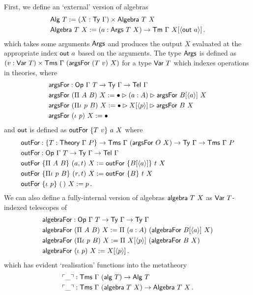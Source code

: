 First, we define an `external' version of algebras
\begin{align*}
    &\mta{Alg}\ T := (X : \Ty\ \Gamma) \times \mta{Algebra}\ T\ X \\
    &\mta{Algebra}\ T\ X := (a : \mta{Args}\ T\ X) \to \Tm\ \Gamma\ X[\Msub{\mta{out}\ a}] \,.
\end{align*}
which takes some arguments $\textsf{Args}$ and produces the output $X$
evaluated at the appropriate index $\mta{out}\ a$ based on the arguments. The
type $\textsf{Args}$ is defined as $(v : \textsf{Var}\ T) \times \textsf{Tms}\ \Gamma\
(\textsf{argsFor}\ (T\ v)\ X)$ for a type $\textsf{Var}\ T$ which indexes operations
in theories, where
\begin{align*}
    &\mta{argsFor} : \mta{Op}\ \Gamma\ T \to \Ty\ \Gamma \to \Tel\ \Gamma \\
    &\mta{argsFor}\ (\Pi\ A\ B)\ X := \bullet \rhd (a : A) \rhd \mta{argsFor}\ B[\Msub a]\ X \\
    &\mta{argsFor}\ (\Pi\iota\ p\ B)\ X := \bullet \rhd X[\Msub p] \rhd \mta{argsFor}\ B\ X \\
    &\mta{argsFor}\ (\iota\ p)\ X := \bullet
\end{align*}
and $\textsf{out}$ is defined as $\mta{outFor}\ \{T\ v\}\ a\ X$ where
\begin{align*}
    &\mta{outFor} : \{T : \Theory\ \Gamma\ P\} \to \Tms\ \Gamma\ (\mta{argsFor}\ O\ X) \to \Ty\ \Gamma \to \Tms\ \Gamma\ P \\
    &\mta{outFor} : \mta{Op}\ \Gamma\ T \to \Ty\ \Gamma \to \Tel\ \Gamma \\
    &\mta{outFor}\ \{\Pi\ A\ B\}\ (a, t)\ X := \mta{outFor}\ \{B[\Msub a]\}\ t\ X \\
    &\mta{outFor}\ \{\Pi\iota\ p\ B\}\ (r, t)\ X := \mta{outFor}\ \{B\}\ t\ X \\
    &\mta{outFor}\ \{\iota\ p\}\ (\,)\ X := p \,.
\end{align*}
We can also define a fully-internal version of algebras $\textsf{algebra}\ T\ X$ as $\textsf{Var}\ T$-indexed telescopes of
\begin{align*}
    &\mta{algebraFor} : \mta{Op}\ \Gamma\ T \to \Ty\ \Gamma \to \Ty\ \Gamma \\
    &\mta{algebraFor}\ (\Pi\ A\ B)\ X := \Pi\ (a : A)\ (\mta{algebraFor}\ B[\Msub a]\ X) \\
    &\mta{algebraFor}\ (\Pi\iota\ p\ B)\ X := \Pi\ X[\Msub p]\ (\mta{algebraFor}\ B\ X) \\
    &\mta{algebraFor}\ (\iota\ p)\ X := X[\Msub p] \,.
\end{align*}
which has evident `realisation' functions into the metatheory
\begin{align*}
    &\ulcorner \_ \urcorner : \textsf{Tms}\ \Gamma\ (\textsf{alg}\ T) \to \textsf{Alg}\ T \\
    &\ulcorner \_ \urcorner : \textsf{Tms}\ \Gamma\ (\textsf{algebra}\ T\ X) \to \textsf{Algebra}\ T\ X \,.
\end{align*}

